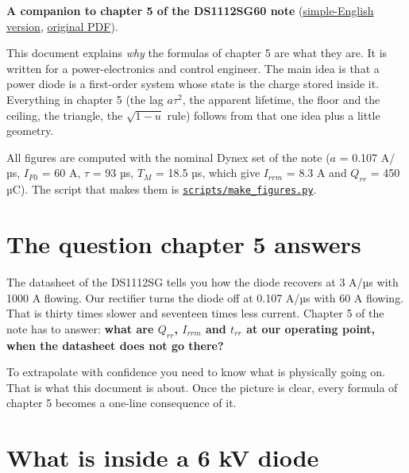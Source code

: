 \documentclass[11pt,a4paper,numbers=noenddot]{scrartcl}
\begin{document}

\tableofcontents
\listoffigures
\newpage
\begin{onehalfspace}

\textbf{A companion to chapter 5 of the DS1112SG60 note} (\href{https://github.com/pwr-control/Semiconductor-Physics-and-Devices/blob/main/diode-reverse-recovery/plecs_diode_parameters_ds1112sg_simple_english.md}{simple-English version}, \href{https://github.com/pwr-control/Semiconductor-Physics-and-Devices/blob/main/diode-reverse-recovery/original/plecs_diode_parameters_ds1112sg.pdf}{original PDF}).

This document explains \emph{why} the formulas of chapter 5 are what they are. It is written for a power-electronics and control engineer. The main idea is that a power diode is a first-order system whose state is the charge stored inside it. Everything in chapter 5 (the lag \(a\tau^2\), the apparent lifetime, the floor and the ceiling, the triangle, the \(\sqrt{1-u}\) rule) follows from that one idea plus a little geometry.

All figures are computed with the nominal Dynex set of the note (\(a\) = 0.107 A/µs, \(I_{F0}\) = 60 A, \(\tau\) = 93 µs, \(T_M\) = 18.5 µs, which give \(I_{rrm}\) = 8.3 A and \(Q_{rr}\) = 450 µC). The script that makes them is \href{https://github.com/pwr-control/Semiconductor-Physics-and-Devices/blob/main/diode-reverse-recovery/scripts/make_figures.py}{\texttt{scripts/make\_figures.py}}.

\section{The question chapter 5 answers}\label{the-question-chapter-5-answers}

The datasheet of the DS1112SG tells you how the diode recovers at 3 A/µs with 1000 A flowing. Our rectifier turns the diode off at 0.107 A/µs with 60 A flowing. That is thirty times slower and seventeen times less current. Chapter 5 of the note has to answer: \textbf{what are \(Q_{rr}\), \(I_{rrm}\) and \(t_{rr}\) at our operating point, when the datasheet does not go there?}

To extrapolate with confidence you need to know what is physically going on. That is what this document is about. Once the picture is clear, every formula of chapter 5 becomes a one-line consequence of it.

\section{What is inside a 6 kV diode}\label{what-is-inside-a-6-kv-diode}


\end{onehalfspace}
\end{document}
